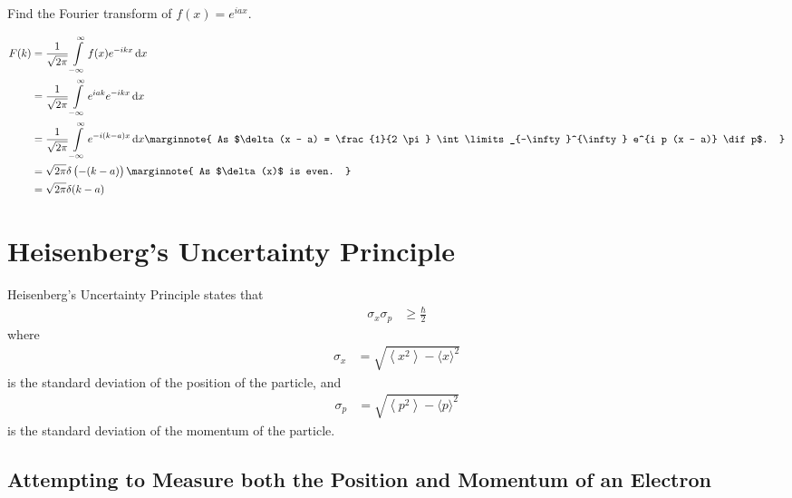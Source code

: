 \documentclass[titlepage, fleqn, a4paper, 12pt, twoside]{article}
\theoremstyle{definition}
\theoremstyle{theorem}
\begin{document}
\begin{question}
	Find the Fourier transform of $f(x) = e^{i a x}$.
\end{question}

\begin{solution}
	\begin{align*}
		F(k) &= \frac{1}{\sqrt{2 \pi}} \int\limits_{-\infty}^{\infty} f(x) e^{-i k x} \dif x\\
		&= \frac{1}{\sqrt{2 \pi}} \int\limits_{-\infty}^{\infty} e^{i a k} e^{-i k x} \dif x\\
		&= \frac{1}{\sqrt{2 \pi}} \int\limits_{-\infty}^{\infty} e^{-i (k - a) x} \dif x
		\marginnote
		{
			As $\delta(x - a) = \frac{1}{2 \pi} \int\limits_{-\infty}^{\infty} e^{i p (x - a)} \dif p$.
		}\\
		&= \sqrt{2 \pi} \delta\left( -(k - a) \right)
		\marginnote
		{
			As $\delta(x)$ is even.
		}\\
		&= \sqrt{2 \pi} \delta(k - a)
	\end{align*}
\end{solution}

\section{Heisenberg's Uncertainty Principle}

Heisenberg's Uncertainty Principle states that
\begin{align*}
	\sigma_x \sigma_p &\ge \frac{\hbar}{2}
\end{align*}
where
\begin{align*}
	\sigma_x &= \sqrt{\left\langle x^2 \right\rangle - {\langle x \rangle}^2}
\end{align*}
is the standard deviation of the position of the particle, and
\begin{align*}
	\sigma_p &= \sqrt{\left\langle p^2 \right\rangle - {\langle p \rangle}^2}
\end{align*}
is the standard deviation of the momentum of the particle.

\subsection{Attempting to Measure both the Position and Momentum of an Electron}
\end{document}
